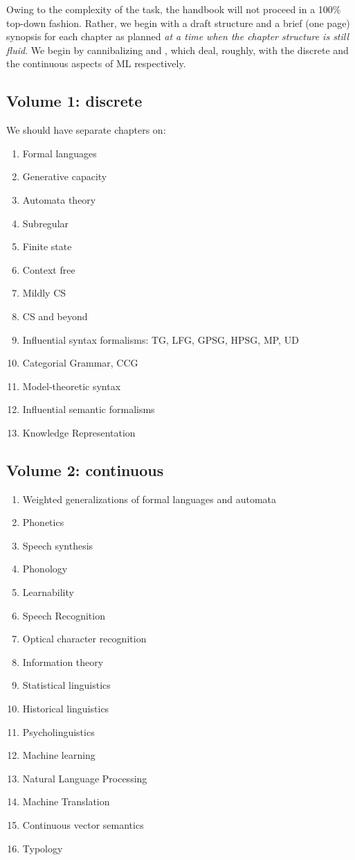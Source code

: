 \noindent
Owing to the complexity of the task, the handbook will not proceed in a 100\%
top-down fashion. Rather, we begin with a draft structure and a brief (one
page) synopsis for each chapter as planned {\it at a time when the chapter
structure is still fluid}. We begin by cannibalizing \cite{Kracht:2003}
and \cite{Kornai:2007}, which deal, roughly, with the discrete and the
continuous aspects of ML respectively. 

\subsection*{Volume 1: discrete}

We should have separate chapters on:

\begin{enumerate}
\item Formal languages
\item Generative capacity
\item Automata theory
\item Subregular
\item Finite state
\item Context free
\item Mildly CS
\item CS and beyond
\item Influential syntax formalisms: TG, LFG, GPSG, HPSG, MP, UD
\item Categorial Grammar, CCG
\item Model-theoretic syntax
\item Influential semantic formalisms
\item Knowledge Representation
\end{enumerate}

\subsection*{Volume 2: continuous}


\begin{enumerate}
\item Weighted generalizations of formal languages and automata
\item Phonetics
\item Speech synthesis
\item Phonology
\item Learnability
\item Speech Recognition
\item Optical character recognition
\item Information theory
\item Statistical linguistics
\item Historical linguistics
\item Psycholinguistics
\item Machine learning
\item Natural Language Processing
\item Machine Translation
\item Continuous vector semantics
\item Typology
\end{enumerate}


